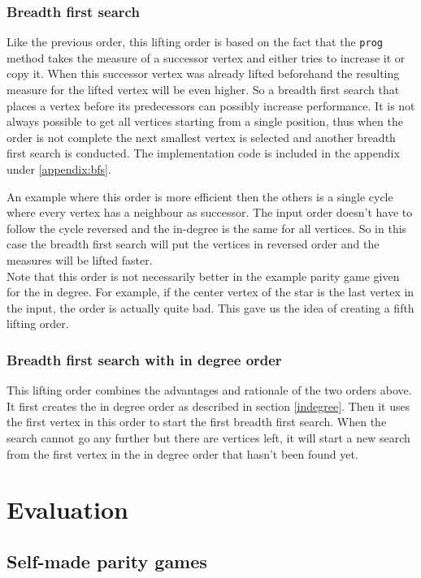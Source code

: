 \documentclass[10pt,a4paper]{article}
\begin{document}
\subsubsection{Breadth first search}
Like the previous order, this lifting order is based on the fact that the \texttt{prog} method takes the measure of a successor vertex and either tries to increase it or copy it. When this successor vertex was already lifted beforehand the resulting measure for the lifted vertex will be even higher. So a breadth first search that places a vertex before its predecessors can possibly increase performance. It is not always possible to get all vertices starting from a single position, thus when the order is not complete the next smallest vertex is selected and another breadth first search is conducted. The implementation code is included in the appendix under \ref{appendix:bfs}.

An example where this order is more efficient then the others is a single cycle where every vertex has a neighbour as successor. The input order doesn't have to follow the cycle reversed and the in-degree is the same for all vertices. So in this case the breadth first search will put the vertices in reversed order and the measures will be lifted faster.\\
Note that this order is not necessarily better in the example parity game given for the in degree. For example, if the center vertex of the star is the last vertex in the input, the order is actually quite bad. This gave us the idea of creating a fifth lifting order.

\subsubsection{Breadth first search with in degree order}
This lifting order combines the advantages and rationale of the two orders above. It first creates the in degree order as described in section \ref{indegree}. Then it uses the first vertex in this order to start the first breadth first search. When the search cannot go any further but there are vertices left, it will start a new search from the first vertex in the in degree order that hasn't been found yet.

\section{Evaluation}\label{eval}

\subsection{Self-made parity games}
\end{document}
